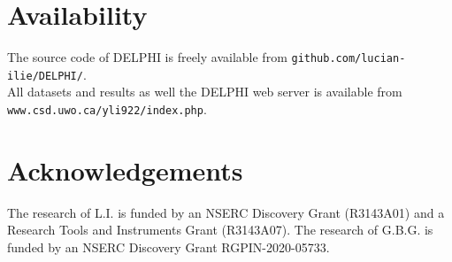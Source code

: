 \documentclass[a0,portrait]{a0poster}
\begin{document}
\begin{multicols}{2}
\begin{mdframed}[linewidth=7pt]
{\vspace*{-20pt}
\section*{Availability} 
The source code of DELPHI is freely available from \texttt{github.com/lucian-ilie/DELPHI/}.\\
All datasets and results as well the DELPHI web server is available from \texttt{www.csd.uwo.ca/\texttildelow{}yli922/index.php}.
\vspace*{-20pt}
\nocite{*} %
\vspace*{-30pt}
\section*{Acknowledgements}
The research of L.I. is funded by an NSERC Discovery Grant (R3143A01) and a Research Tools and Instruments Grant (R3143A07). The research of G.B.G. is funded by an NSERC Discovery Grant RGPIN-2020-05733.
}
\end{mdframed}
\end{multicols}
\end{document}

